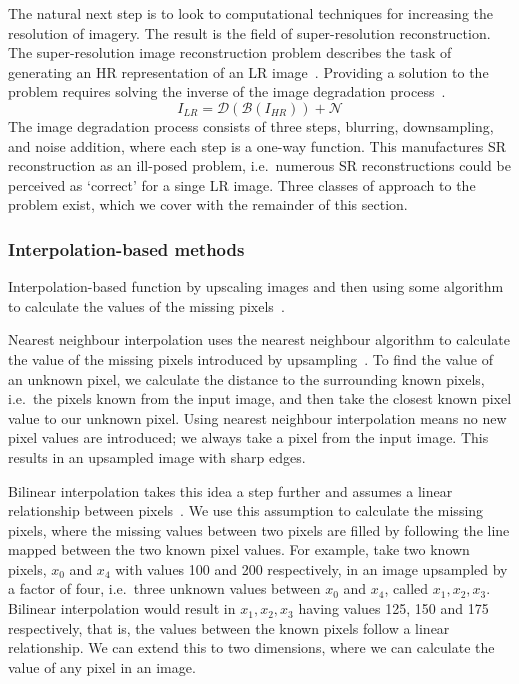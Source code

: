 The natural next step is to look to computational techniques for increasing the resolution of imagery. The result is the field of super-resolution reconstruction. The super-resolution image reconstruction problem describes the task of generating an HR representation of an LR image~\cite{ref}. Providing a solution to the problem requires solving the inverse of the image degradation process~\cite{imageDeg}.
\[I_{LR} = \mathcal{D}(\mathcal{B}(I_{HR})) + \mathcal{N}\]
The image degradation process consists of three steps, blurring, downsampling, and noise addition, where each step is a one-way function. This manufactures SR reconstruction as an ill-posed problem, i.e.\ numerous SR reconstructions could be perceived as `correct' for a singe LR image. Three classes of approach to the problem exist, which we cover with the remainder of this section.

\subsubsection{Interpolation-based methods}
Interpolation-based function by upscaling images and then using some algorithm to calculate the values of the missing pixels~\cite{interpolation}.

Nearest neighbour interpolation uses the nearest neighbour algorithm to calculate the value of the missing pixels introduced by upsampling~\cite{nnInterpolation}. To find the value of an unknown pixel, we calculate the distance to the surrounding known pixels, i.e.\ the pixels known from the input image, and then take the closest known pixel value to our unknown pixel. Using nearest neighbour interpolation means no new pixel values are introduced; we always take a pixel from the input image. This results in an upsampled image with sharp edges.

Bilinear interpolation takes this idea a step further and assumes a linear relationship between pixels~\cite{bilnearInterpolation}. We use this assumption to calculate the missing pixels, where the missing values between two pixels are filled by following the line mapped between the two known pixel values. For example, take two known pixels, $x_0$ and $x_4$ with values 100 and 200 respectively, in an image upsampled by a factor of four, i.e.\ three unknown values between $x_0$ and $x_4$, called $x_1, x_2, x_3$. Bilinear interpolation would result in $x_1, x_2, x_3$ having values 125, 150 and 175 respectively, that is, the values between the known pixels follow a linear relationship. We can extend this to two dimensions, where we can calculate the value of any pixel in an image.

